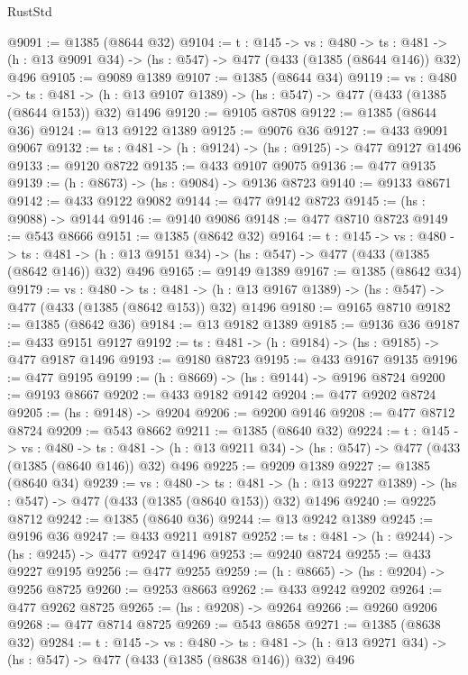 \begin{lexlean}{RustStd}
\begin{coremodule}
{\begin{coremodule}
{{{{{{{{{{{{{{{{@9091 := @1385 (@8644 @32)
@9104 := {t : @145} ->
  {vs : @480} ->
  {ts : @481} -> (h : @13 @9091 @34) -> (hs : @547) -> @477 (@433 (@1385 (@8644 @146)) @32) @496
@9105 := @9089 @1389
@9107 := @1385 (@8644 @34)
@9119 := {vs : @480} ->
  {ts : @481} -> (h : @13 @9107 @1389) -> (hs : @547) -> @477 (@433 (@1385 (@8644 @153)) @32) @1496
@9120 := @9105 @8708
@9122 := @1385 (@8644 @36)
@9124 := @13 @9122 @1389
@9125 := @9076 @36
@9127 := @433 @9091 @9067
@9132 := {ts : @481} -> (h : @9124) -> (hs : @9125) -> @477 @9127 @1496
@9133 := @9120 @8722
@9135 := @433 @9107 @9075
@9136 := @477 @9135
@9139 := (h : @8673) -> (hs : @9084) -> @9136 @8723
@9140 := @9133 @8671
@9142 := @433 @9122 @9082
@9144 := @477 @9142 @8723
@9145 := (hs : @9088) -> @9144
@9146 := @9140 @9086
@9148 := @477 @8710 @8723
@9149 := @543 @8666
@9151 := @1385 (@8642 @32)
@9164 := {t : @145} ->
  {vs : @480} ->
  {ts : @481} -> (h : @13 @9151 @34) -> (hs : @547) -> @477 (@433 (@1385 (@8642 @146)) @32) @496
@9165 := @9149 @1389
@9167 := @1385 (@8642 @34)
@9179 := {vs : @480} ->
  {ts : @481} -> (h : @13 @9167 @1389) -> (hs : @547) -> @477 (@433 (@1385 (@8642 @153)) @32) @1496
@9180 := @9165 @8710
@9182 := @1385 (@8642 @36)
@9184 := @13 @9182 @1389
@9185 := @9136 @36
@9187 := @433 @9151 @9127
@9192 := {ts : @481} -> (h : @9184) -> (hs : @9185) -> @477 @9187 @1496
@9193 := @9180 @8723
@9195 := @433 @9167 @9135
@9196 := @477 @9195
@9199 := (h : @8669) -> (hs : @9144) -> @9196 @8724
@9200 := @9193 @8667
@9202 := @433 @9182 @9142
@9204 := @477 @9202 @8724
@9205 := (hs : @9148) -> @9204
@9206 := @9200 @9146
@9208 := @477 @8712 @8724
@9209 := @543 @8662
@9211 := @1385 (@8640 @32)
@9224 := {t : @145} ->
  {vs : @480} ->
  {ts : @481} -> (h : @13 @9211 @34) -> (hs : @547) -> @477 (@433 (@1385 (@8640 @146)) @32) @496
@9225 := @9209 @1389
@9227 := @1385 (@8640 @34)
@9239 := {vs : @480} ->
  {ts : @481} -> (h : @13 @9227 @1389) -> (hs : @547) -> @477 (@433 (@1385 (@8640 @153)) @32) @1496
@9240 := @9225 @8712
@9242 := @1385 (@8640 @36)
@9244 := @13 @9242 @1389
@9245 := @9196 @36
@9247 := @433 @9211 @9187
@9252 := {ts : @481} -> (h : @9244) -> (hs : @9245) -> @477 @9247 @1496
@9253 := @9240 @8724
@9255 := @433 @9227 @9195
@9256 := @477 @9255
@9259 := (h : @8665) -> (hs : @9204) -> @9256 @8725
@9260 := @9253 @8663
@9262 := @433 @9242 @9202
@9264 := @477 @9262 @8725
@9265 := (hs : @9208) -> @9264
@9266 := @9260 @9206
@9268 := @477 @8714 @8725
@9269 := @543 @8658
@9271 := @1385 (@8638 @32)
@9284 := {t : @145} ->
  {vs : @480} ->
  {ts : @481} -> (h : @13 @9271 @34) -> (hs : @547) -> @477 (@433 (@1385 (@8638 @146)) @32) @496
}}}}}}}}}}}}}}}}
\end{coremodule}}
\end{coremodule}
\end{lexlean}
